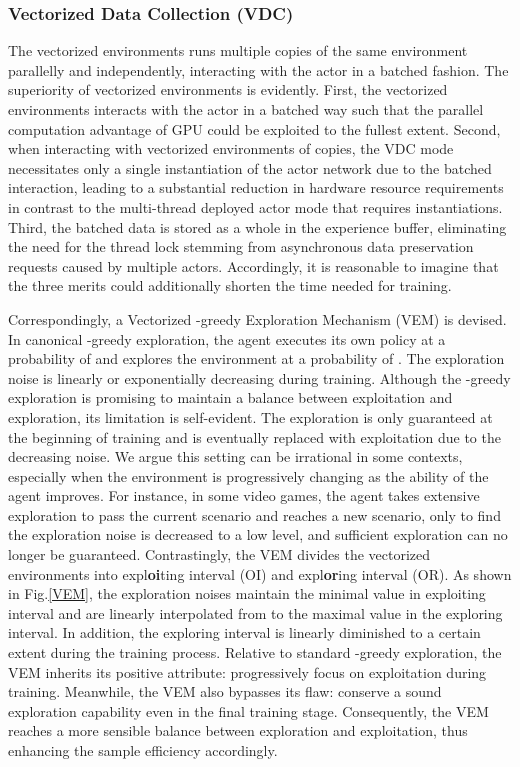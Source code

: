 \documentclass[journal]{IEEEtran}
\begin{document}
\subsubsection{Vectorized Data Collection (VDC)}
The vectorized environments runs multiple copies of the same environment parallelly and independently, interacting with the actor in a batched fashion. The superiority of vectorized environments is evidently. First, the vectorized environments interacts with the actor in a batched way such that the parallel computation advantage of GPU could be exploited to the fullest extent. Second, when interacting with vectorized environments of  copies, the VDC mode necessitates only a single instantiation of the actor network due to the batched interaction, leading to a substantial reduction in hardware resource requirements in contrast to the multi-thread deployed actor mode that requires  instantiations. Third, the batched data is stored as a whole in the experience buffer, eliminating the need for the thread lock stemming from asynchronous data preservation requests caused by multiple actors. Accordingly, it is reasonable to imagine that the three merits could additionally shorten the time needed for training.



Correspondingly, a Vectorized -greedy Exploration Mechanism (VEM) is devised. In canonical -greedy exploration, the agent executes its own policy at a probability of  and explores the environment at a probability of . The exploration noise  is linearly or exponentially decreasing during training. Although the -greedy exploration is promising to maintain a balance between exploitation and exploration, its limitation is self-evident. The exploration is only guaranteed at the beginning of training and is eventually replaced with exploitation due to the decreasing noise. We argue this setting can be irrational in some contexts, especially when the environment is progressively changing as the ability of the agent improves. For instance, in some video games, the agent takes extensive exploration to pass the current scenario and reaches a new scenario, only to find the exploration noise is decreased to a low level, and sufficient exploration can no longer be guaranteed. Contrastingly, the VEM divides the vectorized environments into expl\textbf{oi}ting interval (OI) and expl\textbf{or}ing interval (OR). As shown in Fig.\ref{VEM}, the exploration noises maintain the minimal value  in exploiting interval and are linearly interpolated from  to the maximal value  in the exploring interval. In addition, the exploring interval is linearly diminished to a certain extent during the training process. Relative to standard -greedy exploration, the VEM inherits its positive attribute: progressively focus on exploitation during training. Meanwhile, the VEM also bypasses its flaw: conserve a sound exploration capability even in the final training stage. Consequently, the VEM reaches a more sensible balance between exploration and exploitation, thus enhancing the sample efficiency accordingly.
\end{document}
